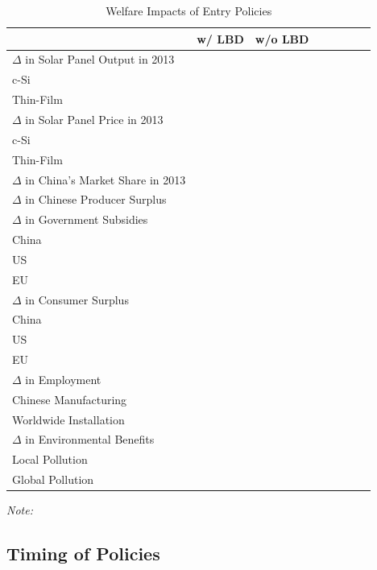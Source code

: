 \documentclass[12pt, letter]{article}
\begin{document}
\begin{table}[tbh]
\centering
\caption{Welfare Impacts of Entry Policies}
\label{tab:cf_entry_policy}
\begin{threeparttable}
\begin{tabularx}{0.75\textwidth}{Xlllllll}
\toprule
 & w/ LBD & w/o LBD  \\
\midrule
$\Delta$ in Solar Panel Output in 2013 &  &  \\
\quad\quad c-Si &  &  \\
\quad\quad Thin-Film &  &  \\
$\Delta$ in Solar Panel Price in 2013 &  &  \\
\quad\quad c-Si &  &  \\
\quad\quad Thin-Film &  &  \\
$\Delta$ in China's Market Share in 2013 &  &  \\
$\Delta$ in Chinese Producer Surplus &  &  \\
$\Delta$ in Government Subsidies &  &  \\
\quad\quad China &  &  \\
\quad\quad US &  &  \\
\quad\quad EU &  &  \\
$\Delta$ in Consumer Surplus &  &  \\
\quad\quad China &  &  \\
\quad\quad US &  &  \\
\quad\quad EU &  &  \\
$\Delta$ in Employment &  &  \\
\quad\quad Chinese Manufacturing & &  \\
\quad\quad Worldwide Installation & &   \\
$\Delta$ in Environmental Benefits &  &  \\
\quad\quad Local Pollution & &  \\
\quad\quad Global Pollution & &  \\
\bottomrule
\end{tabularx}
\begin{tablenotes}
  \item \textit{Note:} 
\end{tablenotes}
\end{threeparttable}
\end{table}

\subsection{Timing of Policies}
\label{subsec:cf_timing}
\end{document}
